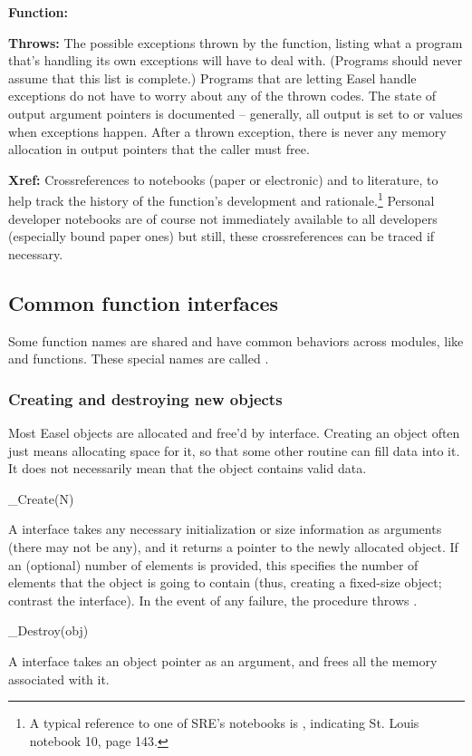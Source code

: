 \begin{sreitems}{\textbf{Function:}}
\item[\textbf{Throws:}] The possible exceptions thrown by the
  function, listing what a program that's handling its own exceptions
  will have to deal with. (Programs should never assume that this list
  is complete.) Programs that are letting Easel handle exceptions do
  not have to worry about any of the thrown codes.  The state of
  output argument pointers is documented -- generally, all output is
  set to  or  values when exceptions happen.
  After a thrown exception, there is never any memory allocation in
  output pointers that the caller must free.

\item[\textbf{Xref:}] Crossreferences to notebooks (paper or
  electronic) and to literature, to help track the history of the
  function's development and rationale.\footnote{A typical reference
  to one of SRE's notebooks is , indicating St. Louis
  notebook 10, page 143.} Personal developer notebooks are of course
  not immediately available to all developers (especially bound paper
  ones) but still, these crossreferences can be traced if necessary.
\end{sreitems}



\subsection{Common function interfaces}

Some function names are shared and have common behaviors across
modules, like  and  functions.  These
special names are called .

  \subsubsection{Creating and destroying new objects}

Most Easel objects are allocated and free'd by
 interface. Creating an object often
just means allocating space for it, so that some other routine can
fill data into it. It does not necessarily mean that the object
contains valid data.

\begin{sreapi}
\hypertarget{ifc:Create} 
{\item[\_Create(N)]}

A  interface takes any necessary initialization or
size information as arguments (there may not be any), and it returns a
pointer to the newly allocated object. If an (optional) number of
elements  is provided, this specifies the number of elements
that the object is going to contain (thus, creating a fixed-size
object; contrast the  interface).  In the
event of any failure, the procedure throws .

\hypertarget{ifc:Destroy} 
{\item[\_Destroy(obj)]}
A  interface takes an object pointer as an
argument, and frees all the memory associated with it.
\end{sreapi}

